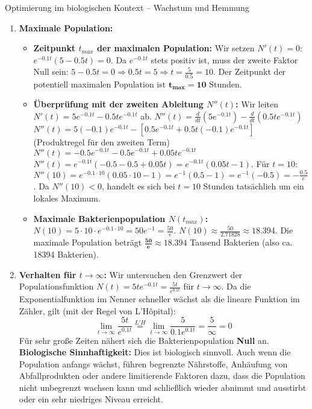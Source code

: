 \begin{loesungsumgebung}{Optimierung im biologischen Kontext – Wachstum und Hemmung}
\begin{enumerate}[label=(\alph*)]
    \item \textbf{Maximale Population:}
    \begin{itemize}
        \item \textbf{Zeitpunkt $t_{max}$ der maximalen Population:}
        Wir setzen $N'(t)=0$: $e^{-0.1t}(5 - 0.5t) = 0$.
        Da $e^{-0.1t}$ stets positiv ist, muss der zweite Faktor Null sein:
        $5 - 0.5t = 0 \Rightarrow 0.5t = 5 \Rightarrow t = \frac{5}{0.5} = 10$.
        Der Zeitpunkt der potentiell maximalen Population ist $\mathbf{t_{max} = 10}$ Stunden.
        \item \textbf{Überprüfung mit der zweiten Ableitung $N''(t)$:}
        Wir leiten $N'(t) = 5e^{-0.1t} - 0.5te^{-0.1t}$ ab.
        $N''(t) = \frac{d}{dt}(5e^{-0.1t}) - \frac{d}{dt}(0.5te^{-0.1t})$
        $N''(t) = 5(-0.1)e^{-0.1t} - [0.5e^{-0.1t} + 0.5t(-0.1)e^{-0.1t}]$ (Produktregel für den zweiten Term)
        $N''(t) = -0.5e^{-0.1t} - 0.5e^{-0.1t} + 0.05te^{-0.1t}$
        $N''(t) = e^{-0.1t}(-0.5 - 0.5 + 0.05t) = e^{-0.1t}(0.05t - 1)$.
        Für $t=10$:
        $N''(10) = e^{-0.1 \cdot 10}(0.05 \cdot 10 - 1) = e^{-1}(0.5 - 1) = e^{-1}(-0.5) = -\frac{0.5}{e}$.
        Da $N''(10) < 0$, handelt es sich bei $t=10$ Stunden tatsächlich um ein lokales Maximum.
        \item \textbf{Maximale Bakterienpopulation $N(t_{max})$:}
        $N(10) = 5 \cdot 10 \cdot e^{-0.1 \cdot 10} = 50e^{-1} = \frac{50}{e}$.
        $N(10) \approx \frac{50}{2.71828} \approx 18.394$.
        Die maximale Population beträgt $\mathbf{\frac{50}{e} \approx 18.394}$ Tausend Bakterien (also ca. 18394 Bakterien).
    \end{itemize}

    \item \textbf{Verhalten für $t \to \infty$:}
    Wir untersuchen den Grenzwert der Populationsfunktion $N(t) = 5t e^{-0.1t} = \frac{5t}{e^{0.1t}}$ für $t \to \infty$.
    Da die Exponentialfunktion im Nenner schneller wächst als die lineare Funktion im Zähler, gilt (mit der Regel von L'Hôpital):
    $$ \lim_{t \to \infty} \frac{5t}{e^{0.1t}} \stackrel{L'H}{=} \lim_{t \to \infty} \frac{5}{0.1e^{0.1t}} = \frac{5}{\infty} = 0 $$
    Für sehr große Zeiten nähert sich die Bakterienpopulation \textbf{Null} an.
    \textbf{Biologische Sinnhaftigkeit:} Dies ist biologisch sinnvoll. Auch wenn die Population anfangs wächst, führen begrenzte Nährstoffe, Anhäufung von Abfallprodukten oder andere limitierende Faktoren dazu, dass die Population nicht unbegrenzt wachsen kann und schließlich wieder abnimmt und ausstirbt oder ein sehr niedriges Niveau erreicht.


\end{enumerate}
\end{loesungsumgebung}
